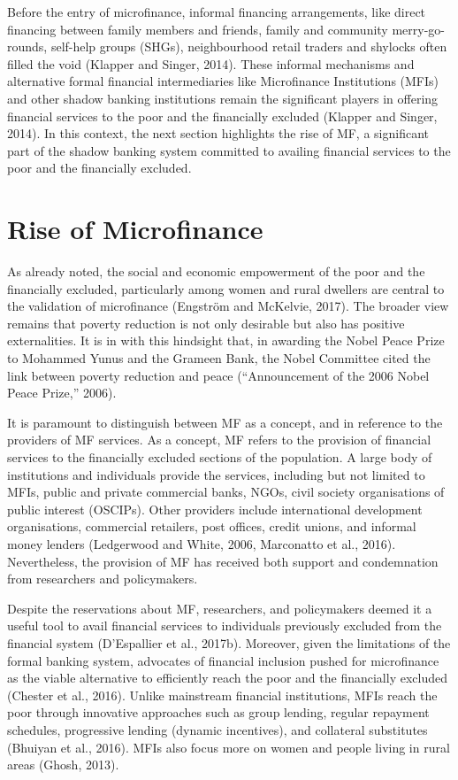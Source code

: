 \documentclass[a4paper, nobind]{templates/ociamthesis}
\begin{document}
Before the entry of microfinance, informal financing arrangements, like direct financing between family members and friends, family and community merry-go-rounds, self-help groups (SHGs), neighbourhood retail traders and shylocks often filled the void (Klapper and Singer, 2014). These informal mechanisms and alternative formal financial intermediaries like Microfinance Institutions (MFIs) and other shadow banking institutions remain the significant players in offering financial services to the poor and the financially excluded (Klapper and Singer, 2014). In this context, the next section highlights the rise of MF, a significant part of the shadow banking system committed to availing financial services to the poor and the financially excluded.

\hypertarget{rise-of-microfinance}{%
\section{Rise of Microfinance}\label{rise-of-microfinance}}

\noindent As already noted, the social and economic empowerment of the poor and the financially excluded, particularly among women and rural dwellers are central to the validation of microfinance (Engström and McKelvie, 2017). The broader view remains that poverty reduction is not only desirable but also has positive externalities. It is in with this hindsight that, in awarding the Nobel Peace Prize to Mohammed Yunus and the Grameen Bank, the Nobel Committee cited the link between poverty reduction and peace (``Announcement of the 2006 Nobel Peace Prize,'' 2006).

It is paramount to distinguish between MF as a concept, and in reference to the providers of MF services. As a concept, MF refers to the provision of financial services to the financially excluded sections of the population. A large body of institutions and individuals provide the services, including but not limited to MFIs, public and private commercial banks, NGOs, civil society organisations of public interest (OSCIPs). Other providers include international development organisations, commercial retailers, post offices, credit unions, and informal money lenders (Ledgerwood and White, 2006, Marconatto et al., 2016). Nevertheless, the provision of MF has received both support and condemnation from researchers and policymakers.

Despite the reservations about MF, researchers, and policymakers deemed it a useful tool to avail financial services to individuals previously excluded from the financial system (D'Espallier et al., 2017b). Moreover, given the limitations of the formal banking system, advocates of financial inclusion pushed for microfinance as the viable alternative to efficiently reach the poor and the financially excluded (Chester et al., 2016). Unlike mainstream financial institutions, MFIs reach the poor through innovative approaches such as group lending, regular repayment schedules, progressive lending (dynamic incentives), and collateral substitutes (Bhuiyan et al., 2016). MFIs also focus more on women and people living in rural areas (Ghosh, 2013).
\end{document}
